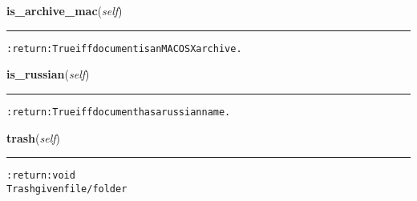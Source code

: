     \vspace{0.5ex}

\hspace{.8\funcindent}\begin{boxedminipage}{\funcwidth}

    \raggedright \textbf{is\_archive\_mac}(\textit{self})

    \vspace{-1.5ex}

    \rule{\textwidth}{0.5\fboxrule}
\setlength{\parskip}{2ex}
\begin{alltt}

:return: True iff document is an MACOSX archive.
\end{alltt}

\setlength{\parskip}{1ex}
    \end{boxedminipage}

    \label{hal:files:models:FileSystem:is_russian}

    \vspace{0.5ex}

\hspace{.8\funcindent}\begin{boxedminipage}{\funcwidth}

    \raggedright \textbf{is\_russian}(\textit{self})

    \vspace{-1.5ex}

    \rule{\textwidth}{0.5\fboxrule}
\setlength{\parskip}{2ex}
\begin{alltt}

:return: True iff document has a russian name.
\end{alltt}

\setlength{\parskip}{1ex}
    \end{boxedminipage}

    \label{hal:files:models:FileSystem:trash}

    \vspace{0.5ex}

\hspace{.8\funcindent}\begin{boxedminipage}{\funcwidth}

    \raggedright \textbf{trash}(\textit{self})

    \vspace{-1.5ex}

    \rule{\textwidth}{0.5\fboxrule}
\setlength{\parskip}{2ex}
\begin{alltt}

:return: void
    Trash given file/folder
\end{alltt}

\setlength{\parskip}{1ex}
    \end{boxedminipage}

